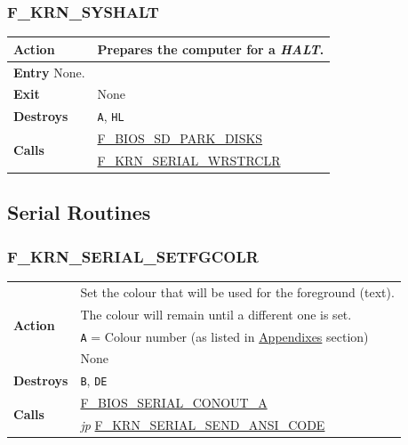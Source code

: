 \documentclass[a4paper,11pt]{article}
\begin{document}
     \subsubsection{F\_KRN\_SYSHALT}
     \label{func:fkrnsyshalt}
     \begin{tabular}{l p{9cm}}
         \hline\multirow[t]{4}{4em}{\textbf{Action}}
         & Prepares the computer for a \textit{HALT}.\\
         \hline\textbf{Entry} None.\\
         \hline\textbf{Exit} & None \\
         \hline\textbf{Destroys} & \texttt{A}, \texttt{HL} \\
         \hline\multirow[t]{2}{4em}{\textbf{Calls}}
         & \hyperref[func:fbiossdparkdisks]{F\_BIOS\_SD\_PARK\_DISKS}\\
         & \hyperref[func:fkrnserialwrstrclr]{F\_KRN\_SERIAL\_WRSTRCLR}\\
         \hline
     \end{tabular}

    \subsection{Serial Routines}

        \subsubsection{F\_KRN\_SERIAL\_SETFGCOLR}
        \label{func:fkrnserialsetfgcolr}
        \begin{tabular}{l p{9cm}}
            \hline\multirow[t]{4}{4em}{\textbf{Action}}
            & Set the colour that will be used for the foreground (text). \\
            & The colour will remain until a different one is set. \\
            \hline\textbf{Entry} & \texttt{A} = Colour number (as listed in 
            \hyperref[sec:appendixes]{Appendixes} section) \\
            \hline\textbf{Exit} & None \\
            \hline\textbf{Destroys} & \texttt{B}, \texttt{DE} \\
            \hline\multirow[t]{2}{4em}{\textbf{Calls}} 
            & \hyperref[func:fbiosserialconouta]{F\_BIOS\_SERIAL\_CONOUT\_A}\\
            & \textit{jp} \hyperref[func:fkrnserialsendansicode]{F\_KRN\_SERIAL\_SEND\_ANSI\_CODE}\\
            \hline
        \end{tabular}
\end{document}
